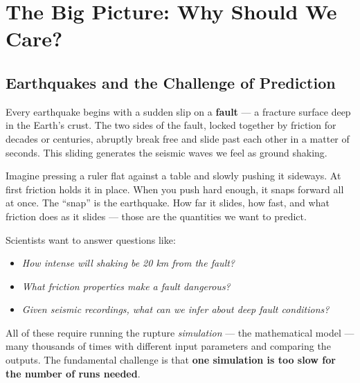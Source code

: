 \documentclass[12pt, a4paper]{article}
\theoremstyle{definition}
\begin{document}
\tableofcontents
\newpage

\section{The Big Picture: Why Should We Care?}
\label{sec:motivation}

\subsection{Earthquakes and the Challenge of Prediction}

Every earthquake begins with a sudden slip on a \textbf{fault} — a fracture
surface deep in the Earth's crust.  The two sides of the fault, locked together
by friction for decades or centuries, abruptly break free and slide past each
other in a matter of seconds.  This sliding generates the seismic waves we feel
as ground shaking.

\begin{tcolorbox}[highlight=myorange, title=Everyday Analogy: The Sticky Ruler]
  Imagine pressing a ruler flat against a table and slowly pushing it sideways.
  At first friction holds it in place. When you push hard enough, it snaps
  forward all at once.  The ``snap'' is the earthquake.  How far it slides, how
  fast, and what friction does as it slides — those are the quantities we want
  to predict.
\end{tcolorbox}

\vspace{6pt}
\noindent Scientists want to answer questions like:
\begin{itemize}[leftmargin=1.5cm]
  \item \textit{How intense will shaking be 20 km from the fault?}
  \item \textit{What friction properties make a fault dangerous?}
  \item \textit{Given seismic recordings, what can we infer about deep fault conditions?}
\end{itemize}

All of these require running the rupture \textit{simulation} — the mathematical
model — many thousands of times with different input parameters and comparing
the outputs.  The fundamental challenge is that \textbf{one simulation is too
slow for the number of runs needed}.
\end{document}
